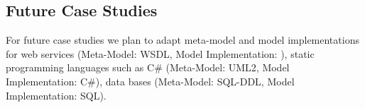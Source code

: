 \subsection{Future Case Studies}

For future case studies we plan to adapt meta-model and model implementations for web services (Meta-Model: WSDL, Model Implementation: ), static programming languages such as C\# (Meta-Model: UML2, Model Implementation: C\#), data bases (Meta-Model: SQL-DDL, Model Implementation: SQL). 

